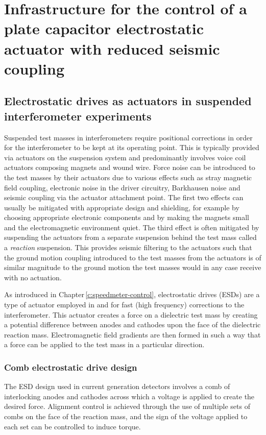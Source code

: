 \chapter{\label{c:esd-concept}Infrastructure for the control of a plate capacitor electrostatic actuator with reduced seismic coupling}

\section{Electrostatic drives as actuators in suspended interferometer experiments}
Suspended test masses in interferometers require positional corrections in order for the interferometer to be kept at its operating point. This is typically provided via actuators on the suspension system and predominantly involves voice coil actuators composing magnets and wound wire. Force noise can be introduced to the test masses by their actuators due to various effects such as stray magnetic field coupling, electronic noise in the driver circuitry, Barkhausen noise \cite{Weiss2008} and seismic coupling via the actuator attachment point. The first two effects can usually be mitigated with appropriate design and shielding, for example by choosing appropriate electronic components and by making the magnets small and the electromagnetic environment quiet. The third effect is often mitigated by suspending the actuators from a separate suspension behind the test mass called a \emph{reaction} suspension. This provides seismic filtering to the actuators such that the ground motion coupling introduced to the test masses from the actuators is of similar magnitude to the ground motion the test masses would in any case receive with no actuation.

As introduced in Chapter\,\ref{c:speedmeter-control}, electrostatic drives (\glspl{ESD}) are a type of actuator employed in \GEO{} and \ALIGO{} for fast (high frequency) corrections to the interferometer. This actuator creates a force on a dielectric test mass by creating a potential difference between anodes and cathodes upon the face of the dielectric reaction mass. Electromagnetic field gradients are then formed in such a way that a force can be applied to the test mass in a particular direction.

\subsection{Comb electrostatic drive design}
The \gls{ESD} design used in current generation detectors involves a comb of interlocking anodes and cathodes across which a voltage is applied to create the desired force. Alignment control is achieved through the use of multiple sets of combs on the face of the reaction mass, and the sign of the voltage applied to each set can be controlled to induce torque.

